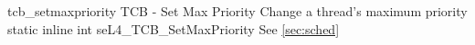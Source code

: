%
%
%
%

\apidoc
{tcb_setmaxpriority}
{TCB - Set Max Priority}
{Change a thread's maximum priority}
{static inline int seL4\_TCB\_SetMaxPriority }
{
}
{\errorenumdesc}
{See \autoref{sec:sched}}
